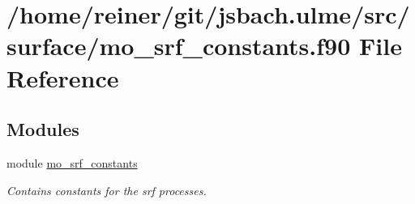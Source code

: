 \hypertarget{mo__srf__constants_8f90}{}\section{/home/reiner/git/jsbach.ulme/src/surface/mo\+\_\+srf\+\_\+constants.f90 File Reference}
\label{mo__srf__constants_8f90}
\subsection*{Modules}
\begin{DoxyCompactItemize}
\item 
module \hyperlink{namespacemo__srf__constants}{mo\+\_\+srf\+\_\+constants}
\begin{DoxyCompactList}\small\item\em Contains constants for the srf processes. \end{DoxyCompactList}\end{DoxyCompactItemize}
